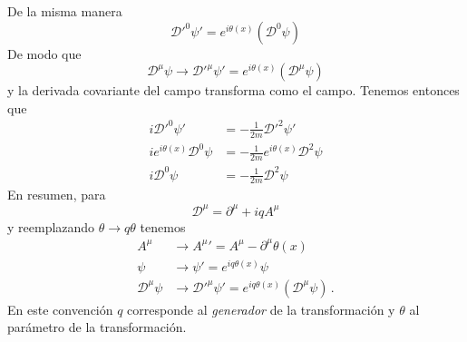 De la misma manera
\begin{equation}
  {\mathcal{D}'}^0\psi'=e^{i\theta(x)}(\mathcal{D}^0\psi)
\end{equation}
De modo que
\begin{equation}
  \mathcal{D}^\mu\psi\to {\mathcal{D}'}^\mu\psi'=e^{i\theta(x)}(\mathcal{D}^\mu\psi)
\end{equation}
y la derivada covariante del campo transforma como el campo. Tenemos entonces que 
\begin{align}
  \label{eq:225}
     i{\mathcal{D}'}^0\psi'&=-\frac{1}{2m}{\boldsymbol{\mathcal{D}}'}^2\psi'\nonumber\\
     ie^{i\theta(x)}{\mathcal{D}}^0\psi&=-\frac{1}{2m}e^{i\theta(x)}{\boldsymbol{\mathcal{D}}}^2\psi\nonumber\\
     i{\mathcal{D}}^0\psi&=-\frac{1}{2m}{\boldsymbol{\mathcal{D}}}^2\psi
\end{align}
En resumen, para 
\begin{equation}
  \mathcal{D}^\mu=\partial^\mu+iqA^\mu
\end{equation}
y reemplazando $\theta\to q\theta$ tenemos
\begin{align}
   A^\mu&\to{A^\mu}'=A^\mu-\partial^\mu\theta(x)\nonumber\\
   \psi&\to \psi'=e^{iq\theta(x)}\psi\nonumber\\
  \mathcal{D}^\mu\psi&\to {\mathcal{D}'}^\mu\psi'=e^{iq\theta(x)}(\mathcal{D}^\mu\psi)\,.
\end{align}
En este convenci\'on $q$ corresponde al \emph{generador} de la transformaci\'on y $\theta$ al par\'ametro de la transformaci\'on.

